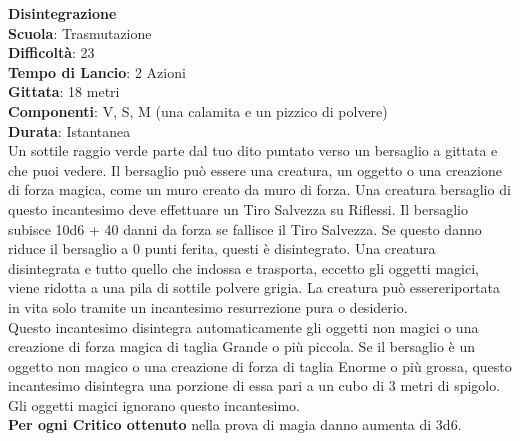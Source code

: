 \begin{multicols}{2}
\medskip\textbf{Disintegrazione}\\
\textbf{Scuola}: Trasmutazione\\
\textbf{Difficoltà}:  23\\
\textbf{Tempo di Lancio}: 2 Azioni\\
\textbf{Gittata}: 18 metri\\
\textbf{Componenti}: V, S, M (una calamita e un pizzico di polvere)\\
\textbf{Durata}: Istantanea\\
Un sottile raggio verde parte dal tuo dito puntato verso un bersaglio a gittata e che puoi vedere. Il bersaglio può essere una creatura, un oggetto o una creazione di forza magica, come un muro creato da muro di forza. Una creatura bersaglio di questo incantesimo deve effettuare un Tiro Salvezza su Riflessi. Il bersaglio subisce 10d6 + 40 danni da forza se fallisce il Tiro Salvezza. Se questo danno riduce il bersaglio a 0 punti ferita, questi è disintegrato. Una creatura disintegrata e tutto quello che indossa e trasporta, eccetto gli oggetti magici, viene ridotta a una pila di sottile polvere grigia. La creatura può essereriportata in vita solo  tramite un incantesimo resurrezione pura o desiderio.\\
Questo incantesimo disintegra automaticamente gli oggetti non magici o una creazione di forza magica di taglia Grande o più piccola. Se il bersaglio è un oggetto non magico o una creazione di forza di taglia Enorme o più grossa, questo incantesimo disintegra una porzione di essa pari a un cubo di 3 metri di spigolo. Gli oggetti magici ignorano questo incantesimo.\\
\textbf{Per ogni Critico ottenuto} nella prova di magia danno aumenta di 3d6.


\end{multicols}

